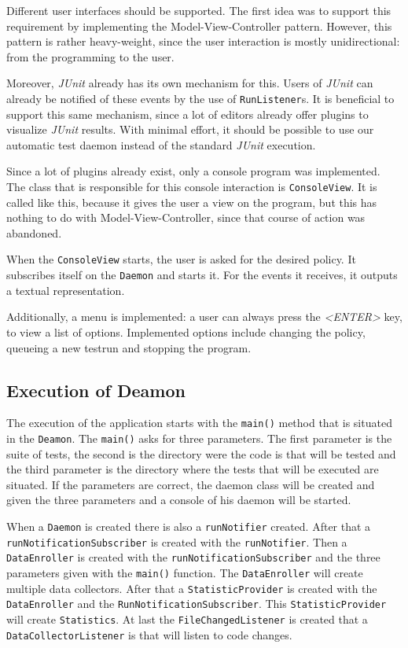 \documentclass[i2]{oss}
\newcommand{\class}[1]{\texttt{#1}}
\newcommand{\method}[1]{\texttt{#1}}
\newcommand{\junit}{\emph{JUnit }}
\begin{document}
Different user interfaces should be supported.
The first idea was to support this requirement by implementing the Model-View-Controller pattern.
However, this pattern is rather heavy-weight, since the user interaction is mostly unidirectional: from the programming to the user.

Moreover, \junit already has its own mechanism for this.
Users of \junit can already be notified of these events by the use of \class{RunListener}s.
It is beneficial to support this same mechanism, since a lot of editors already offer plugins to visualize \junit results.
With minimal effort, it should be possible to use our automatic test daemon instead of the standard \junit execution.

Since a lot of plugins already exist, only a console program was implemented.
The class that is responsible for this console interaction is \class{ConsoleView}.
It is called like this, because it gives the user a view on the program, but this has nothing to do with Model-View-Controller, since that course of action was abandoned.

When the \class{ConsoleView} starts, the user is asked for the desired policy.
It subscribes itself on the \class{Daemon} and starts it.
For the events it receives, it outputs a textual representation.

Additionally, a menu is implemented: a user can always press the \emph{<ENTER>} key, to view a list of options.
Implemented options include changing the policy, queueing a new testrun and stopping the program.


\subsection{Execution of Deamon}

The execution of the application starts with the \method{main()} method that is situated in the \class{Deamon}. The \method{main()} asks for three parameters. The first parameter is the suite of tests, the second is the directory were the code is that will be tested and the third parameter is the directory where the tests that will be executed are situated. If the parameters are correct, the daemon class will be created and given the three parameters and a console of his daemon will be started.  

When a \class{Daemon} is created there is also a \class{runNotifier} created. After that a \class{runNotificationSubscriber} is created with the \class{runNotifier}. Then a \class{DataEnroller} is created with the \class{runNotificationSubscriber} and the three parameters given with the \method{main()} function. The \class{DataEnroller} will create multiple data collectors. After that a \class{StatisticProvider} is created with the \class{DataEnroller} and the \class{RunNotificationSubscriber}. This \class{StatisticProvider} will create \class{Statistics}. At last the \class{FileChangedListener} is created that a \class{DataCollectorListener} is that will listen to  code changes.
\end{document}
